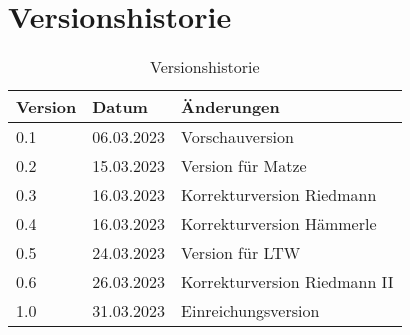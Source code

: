\section*{Versionshistorie}

\begin{table}[H]
  \centering
  \begin{tabular}{lll}
    \toprule
    \textbf{Version} & \textbf{Datum} & \textbf{Änderungen}          \\
    \midrule
    0.1              & 06.03.2023     & Vorschauversion              \\
    0.2              & 15.03.2023     & Version für Matze            \\
    0.3              & 16.03.2023     & Korrekturversion Riedmann    \\
    0.4              & 16.03.2023     & Korrekturversion Hämmerle    \\
    0.5              & 24.03.2023     & Version für LTW              \\
    0.6              & 26.03.2023     & Korrekturversion Riedmann II \\
    1.0              & 31.03.2023     & Einreichungsversion          \\
    \bottomrule
  \end{tabular}
  \caption{Versionshistorie}
  \label{tab:versionshistorie}
\end{table}